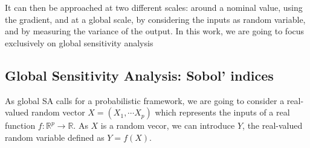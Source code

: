 \documentclass[../../Main_ManuscritThese.tex]{subfiles}
\begin{document}
It can then be approached at two different scales:
around a nominal value, using the gradient, and at a global scale, by
considering the inputs as random variable, and by measuring the
variance of the output. In this work, we are going to focus
exclusively on global sensitivity analysis
\subsection{Global Sensitivity Analysis: Sobol' indices}
\label{sec:sobol-indices}
As global SA calls for a probabilistic framework, we are going to
consider a real-valued random vector $X=(X_1,\cdots X_p)$ which
represents the inputs of a real function
$f: \mathbb{R}^p\rightarrow \mathbb{R}$.  As $X$ is a random vecor,
we can introduce $Y$, the real-valued random variable defined
as $Y=f(X)$.
\end{document}
